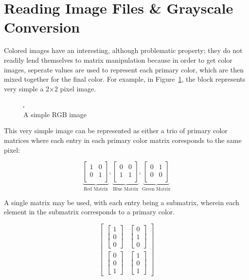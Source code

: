 \section{Reading Image Files \& Grayscale Conversion}

Colored images have an interesting, although problematic property; they do
not readily lend themselves to matrix             manipulation because in
order to get color images, seperate values are used to represent each primary
color, which are       then mixed together for the final color.  For example,
in Figure~\ref{fig:example}, the block represents very simple a
2$\times$2 pixel image.

\begin{figure}[ht]
  \centering
  \includegraphics[scale=30]{./img/sqr.png}
  \caption{A simple RGB image}
  \label{fig:example}
\end{figure}

This very simple
image can be
represented as either
a trio of primary
color matrices where
each entry in each
primary        color
matrix coresponds to
the same pixel:

\[  
  \underbrace{
    \begin{bmatrix}
      1&0\\
      0&1\\
    \end{bmatrix}
  }_{\text{Red
  Matrix}}
  ,
  \underbrace{
    \begin{bmatrix}
      0&0\\
      1&1\\
    \end{bmatrix}
  }_{\text{Blue
  Matrix}}
  ,
  \underbrace{
    \begin{bmatrix}
      0&1\\
      0&0\\
    \end{bmatrix}
  }_{\text{Green
  Matrix}}
\]

A
single
matrix
may
be
used,
with
each
entry
being
a
submatrix,
wherein
each
element
in
the
submatrix
corresponds
to
a
primary
color.

\[  
  \begin{bmatrix}
    \begin{bmatrix}1\\0\\0\end{bmatrix}
    &
    \begin{bmatrix}0\\1\\0\end{bmatrix}\\[2em]
    \begin{bmatrix}0\\0\\1\end{bmatrix}
    &
    \begin{bmatrix}1\\0\\1\end{bmatrix}
  \end{bmatrix}
\]

